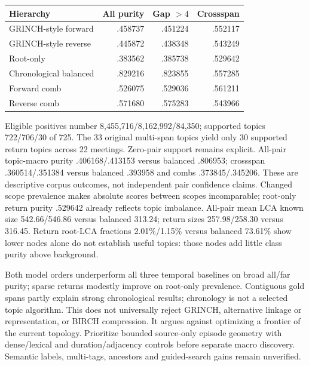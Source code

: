 \documentclass[11pt]{article}
\begin{document}
\begin{center}\small
\begin{tabular}{lrrr}
Hierarchy & All purity & Gap $>4$ & Crossspan \\\hline
GRINCH-style forward & .458737 & .451224 & .552117 \\
GRINCH-style reverse & .445872 & .438348 & .543249 \\
Root-only & .383562 & .385738 & .529642 \\
Chronological balanced & .829216 & .823855 & .557285 \\
Forward comb & .526075 & .529036 & .561211 \\
Reverse comb & .571680 & .575283 & .543966
\end{tabular}\end{center}

Eligible positives number 8,455,716/8,162,992/84,350; supported topics
722/706/30 of 725. The 33 original multi-span topics yield only 30 supported
return topics across 22 meetings. Zero-pair support remains explicit.
All-pair topic-macro purity .406168/.413153 versus balanced .806953;
crossspan .360514/.351384 versus balanced .393958 and combs .373845/.345206.
These are descriptive corpus outcomes, not independent pair confidence claims.
Changed scope prevalence makes absolute scores between scopes incomparable;
root-only return purity .529642 already reflects topic imbalance.
All-pair mean LCA known size 542.66/546.86 versus balanced 313.24;
return sizes 257.98/258.30 versus 316.45. Return root-LCA fractions
2.01\%/1.15\% versus balanced 73.61\% show lower nodes alone do not establish
useful topics: those nodes add little class purity above background.

Both model orders underperform all three temporal baselines on broad all/far
purity; sparse returns modestly improve on root-only prevalence. Contiguous gold
spans partly explain strong chronological results; chronology is not a selected
topic algorithm. This does not universally reject GRINCH, alternative linkage or
representation, or BIRCH compression. It argues against optimizing a frontier of
the current topology. Prioritize bounded source-only episode geometry with
dense/lexical and duration/adjacency controls before separate macro discovery.
Semantic labels, multi-tags, ancestors and guided-search gains remain unverified.
\end{document}
